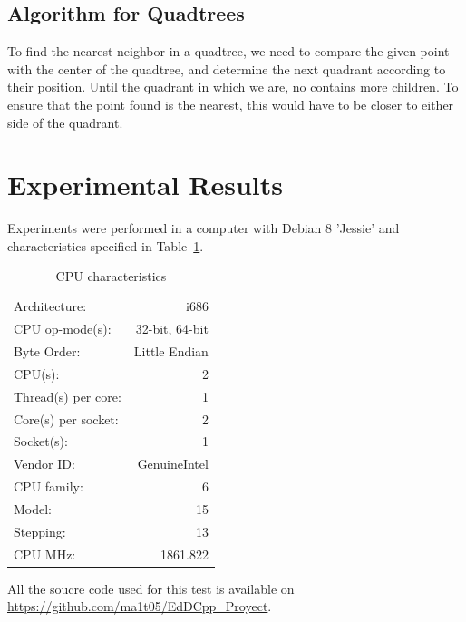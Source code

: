 \documentclass[ijoc,nonblindrev]{informs3} %
\begin{document}
\subsection{Algorithm for Quadtrees}
To find the nearest neighbor in a quadtree,
we need to compare the given point with the center of the quadtree,
and determine the next quadrant according to their position.
Until the quadrant in which we are, no contains more children.
To ensure that the point found is the nearest,
this would have to be closer to either side of the quadrant.

\section{Experimental Results}
Experiments were performed in a computer with Debian 8 'Jessie'
and characteristics specified in Table~\ref{tab:cpu}.

\begin{table}[h]
  \caption{CPU characteristics}
  \label{tab:cpu}
  \begin{center}
    \begin{tabular}{|l|r|}
      \hline
      Architecture:        & i686 \\
      CPU op-mode(s):      & 32-bit, 64-bit \\
      Byte Order:          & Little Endian \\
      CPU(s):              & 2 \\
      Thread(s) per core:  & 1 \\
      Core(s) per socket:  & 2 \\
      Socket(s):           & 1 \\
      Vendor ID:           & GenuineIntel \\
      CPU family:          & 6 \\
      Model:               & 15 \\
      Stepping:            & 13 \\
      CPU MHz:             & 1861.822 \\
      \hline
    \end{tabular}
  \end{center}
\end{table}
All the soucre code used for this test is available on
\url{https://github.com/ma1t05/EdDCpp_Proyect}.
\end{document}
